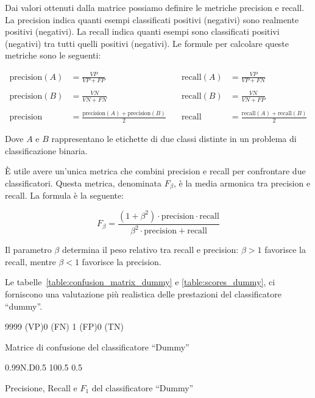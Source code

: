 Dai valori ottenuti dalla matrice possiamo definire le metriche precision e
recall. La precision indica quanti esempi classificati positivi (negativi)
sono realmente positivi (negativi). La recall indica quanti esempi sono
classificati positivi (negativi) tra tutti quelli positivi (negativi). Le
formule per calcolare queste metriche sono le seguenti:

$$\begin{aligned}
    \text{precision}(A) &= \frac{VP}{VP + FP} & \quad \text{recall}(A) &= \frac{VP}{VP + FN} \\
    \\
    \text{precision}(B) &= \frac{VN}{VN + FN} & \quad \text{recall}(B) &= \frac{VN}{VN + FP} \\
    \\
    \text{precision} &= \frac{\text{precision}(A) + \text{precision}(B)}{2} & \quad \text{recall} &= \frac{\text{recall}(A) + \text{recall}(B)}{2}
\end{aligned}$$

Dove $A$ e $B$ rappresentano le etichette di due classi distinte in un
problema di classificazione binaria.

È utile avere un'unica metrica che combini precision e recall per confrontare
due classificatori. Questa metrica, denominata $F_\beta$, è la media armonica
tra precision e recall. La formula è la seguente:

$$F_\beta=\frac{(1+\beta^2)\cdot\text{precision}\cdot\text{recall}}{\beta^2\cdot\text{precision}+\text{recall}}$$

Il parametro $\beta$ determina il peso relativo tra recall e precision:
$\beta>1$ favorisce la recall, mentre $\beta<1$ favorisce la precision.

Le tabelle~\ref{table:confusion_matrix_dummy} e \ref{table:scores_dummy}, ci
forniscono una valutazione più realistica delle prestazioni del classificatore
``dummy''.

\begin{table}[!ht]
    \centering
    \confusionmatrix%
    {9999 (VP)}{0 (FN)}%
    {1 (FP)}{0 (TN)}
    \caption{Matrice di confusione del classificatore ``Dummy''}
    \label{table:confusion_matrix_dummy}
\end{table}

\begin{table}[!ht]
    \centering
    \scores%
    {0.99}{N.D}{0.5}%
    {1}{0}{0.5}%
    {0.5}
    \caption{Precisione, Recall e $F_1$ del classificatore ``Dummy''}
    \label{table:scores_dummy}
\end{table}

